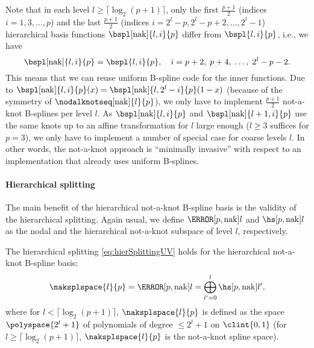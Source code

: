 Note that in each level $l \ge \lceil\log_2(p+1)\rceil$,
only the first $\tfrac{p+1}{2}$
(indices $i = 1, 3, \dotsc, p$)
and the last $\tfrac{p+1}{2}$
(indices $i = 2^l - p, 2^l - p + 2, \dotsc, 2^l - 1$)
hierarchical basis functions $\bspl[\nak]{l,i}{p}$
differ from $\bspl{l,i}{p}$,
i.e., we have
\begin{equation}
  \bspl[\nak]{l,i}{p} = \bspl{l,i}{p},\quad
  i = p + 2,\; p + 4,\; \dotsc,\; 2^l - p - 2.
\end{equation}
This means that we can reuse uniform B-spline code
for the inner functions.
Due to $\bspl[\nak]{l,i}{p}(x) = \bspl[\nak]{l,2^l-i}{p}(1-x)$
(because of the symmetry of $\nodalknotseq[\nak]{l}{p}$),
we only have to implement $\tfrac{p+1}{2}$ not-a-knot B-splines per level $l$.
As $\bspl[\nak]{l,i}{p}$ and $\bspl[\nak]{l+1,i}{p}$
use the same knots up to an affine transformation for $l$ large enough
($l \ge 3$ suffices for $p = 3$),
we only have to implement a number of special case for coarse levels $l$.
In other words, the not-a-knot approach is ``minimally invasive''
with respect to an implementation that already uses uniform B-splines.

\paragraph{Hierarchical splitting}

The main benefit of the hierarchical not-a-knot B-spline basis
is the validity of the hierarchical splitting.
Again usual, we define $\nsbspl[\nak]{l}{p}$ and $\hsbspl[\nak]{l}{p}$
as the nodal and the hierarchical not-a-knot subspace of level $l$,
respectively.

\begin{proposition}
  \label{prop:hierSplittingNAKBSplineUV}
  The hierarchical splitting \eqref{eq:hierSplittingUV}
  holds for the hierarchical not-a-knot B-spline basis:
  \begin{equation}
    \naksplspace{l}{p}
    = \nsbspl[\nak]{l}{p}
    = \bigoplus_{l'=0}^l \hsbspl[\nak]{l'}{p},
  \end{equation}
  where for $l < \lceil\log_2(p+1)\rceil$, $\naksplspace{l}{p}$
  is defined as the space $\polyspace{2^l + 1}$ of polynomials of degree
  $\le 2^l + 1$ on $\clint{0, 1}$
  (for $l \ge \lceil\log_2(p+1)\rceil$,
  $\naksplspace{l}{p}$ is the not-a-knot spline space).
\end{proposition}


